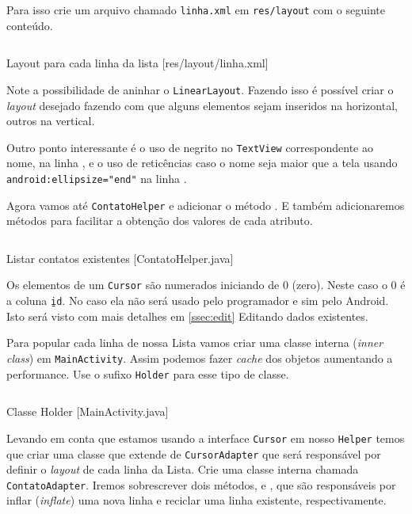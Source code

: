 Para isso crie um arquivo chamado \texttt{linha.xml} em \texttt{res/layout} com o seguinte conteúdo.

\begin{listing}[H]
  \inputminted[linenos=true,frame=bottomline,tabsize=3]{ xml }{ source/linha-1.xml }
  \caption{Layout para cada linha da lista [res/layout/linha.xml]}
\end{listing}

Note a possibilidade de aninhar o \texttt{LinearLayout}. Fazendo isso é possível criar o \textit{layout}
desejado fazendo com que alguns elementos sejam inseridos na horizontal, outros na vertical.

Outro ponto interessante é o uso de negrito no \texttt{TextView} correspondente ao nome, na linha ,
e o uso de reticências caso o nome seja maior que a tela usando \texttt{android:ellipsize="end"} na linha
.

Agora vamos até \texttt{ContatoHelper} e adicionar o método . E também adicionaremos
métodos para facilitar a obtenção dos valores de cada atributo.

\begin{listing}[H]
  \inputminted[linenos=true,frame=bottomline,tabsize=3]{ java }{ source/ContatoHelper-3.java }
  \caption{Listar contatos existentes [ContatoHelper.java]}
\end{listing}

Os elementos de um \texttt{Cursor} são numerados iniciando de 0 (zero). Neste caso o 0 é a coluna
\texttt{\b{ }id}. No caso ela não será usado pelo programador e sim pelo Android. Isto
será visto com mais detalhes em \ref{ssec:edit} Editando dados existentes.

Para popular cada linha de nossa Lista vamos criar uma classe interna (\textit{inner class}) em
\texttt{MainActivity}. Assim podemos fazer \textit{cache} dos objetos aumentando a performance.
Use o sufixo \texttt{Holder} para esse tipo de classe.

\begin{listing}[H]
  \inputminted[linenos=true,frame=bottomline,tabsize=3]{ java }{ source/MainActivity-4.java }
  \caption{Classe Holder [MainActivity.java]}
\end{listing}

Levando em conta que estamos usando a interface \texttt{Cursor} em nosso \texttt{Helper} temos
que criar uma classe que extende de \texttt{CursorAdapter} que será responsável por definir o
\textit{layout} de cada linha da Lista. Crie uma classe interna chamada \texttt{ContatoAdapter}.
Iremos sobrescrever dois métodos,  e , que são responsáveis
por inflar (\textit{inflate}) uma nova linha e reciclar uma linha existente, respectivamente.

